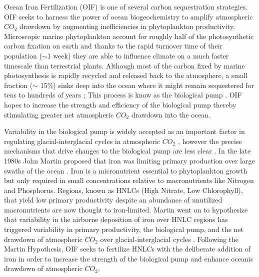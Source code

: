 Ocean Iron Fertilization (OIF) is one of several carbon sequestration strategies. OIF seeks to harness the power of ocean biogeochemistry to amplify atmospheric $CO_2$ drawdown by augmenting inefficiencies in phytoplankton productivity. Microscopic marine phytoplankton account for roughly half of the photosynthetic carbon fixation on earth \parencite{FalkowskiGlobalCarbonCycle2000} and thanks to the rapid turnover time of their population ($\sim$1 week) they are able to influence climate on a much faster timescale \parencite{Falkowskioceaninvisibleforest2002} than terrestrial plants. Although most of the carbon fixed by marine photosynthesis is rapidly recycled and released back to the atmosphere, a small fraction ($\sim$ 15\%) sinks deep into the ocean where it might remain sequestered for tens to hundreds of years \parencite{LawsTemperatureeffectsexport2000}; This process is know as the biological pump \parencite{delaRochaChapterBiologicalPump2006}. OIF hopes to increase the strength and efficiency of the biological pump thereby stimulating greater net atmospheric $CO_2$ drawdown into the ocean.  

Variability in the biological pump is widely accepted as an important factor in regulating glacial-interglacial cycles in atmospheric $CO_2$ \parencite{BernermodelatmosphericCO1991, SigmanGlacialinterglacialvariations2000}, however the precise mechanisms that drive changes to the biological pump are less clear \parencite{FalkowskiEvolutionnitrogencycle1997}. In the late 1980s John Martin proposed that iron was limiting primary production over large swaths of the ocean \parencite{MartinIrondeficiencylimits1988}. Iron is a micronutrient essential to phytoplankton growth but only required in small concentrations relative to macronutrients like Nitrogen and Phosphorus. Regions, known as HNLCs (High Nitrate, Low Chlorophyll), that yield low primary productivity despite an abundance of unutilized macronutrients are now thought to iron-limited. Martin went on to hypothesize that variability in the airborne deposition of iron over HNLC regions has triggered variability in primary productivity, the biological pump, and the net drawdown of atmospheric $CO_2$  over glacial-interglacial cycles \parencite{MartinGlacialinterglacialCO2change1990}. Following the Martin Hypothesis, OIF seeks to fertilize HNLCs with the deliberate addition of iron in order to increase the strength of the biological pump and enhance oceanic drawdown of atmospheric $CO_2$.

